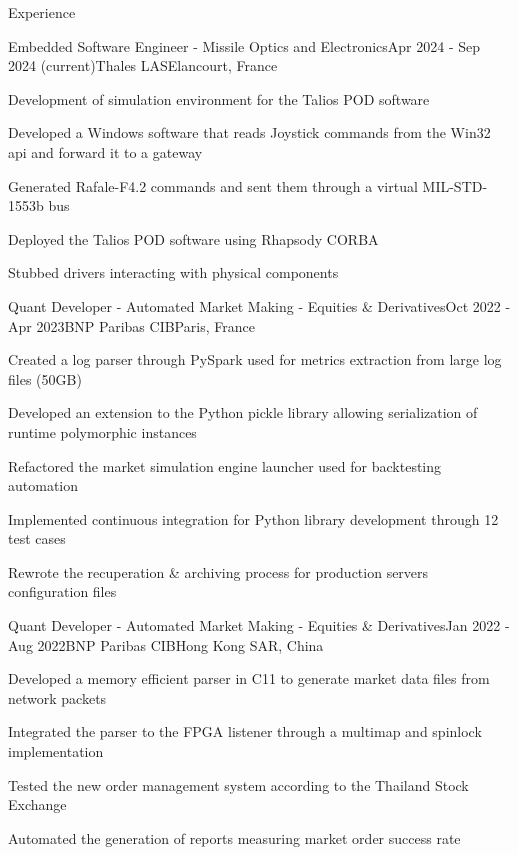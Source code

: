 \documentclass[
	a4paper, %
	10pt, %
]{resume} %
\def\CC{{C\nolinebreak[4]\hspace{-.05em}\raisebox{.4ex}{\tiny\bf ++}}}
\begin{document}
\begin{rSection}{Experience}

	\begin{rSubsection}{Embedded Software Engineer - Missile Optics and Electronics}{Apr 2024 - Sep 2024 (current)}{Thales LAS}{Elancourt, France}
		\item Development of simulation environment for the Talios POD software
    \item Developed a Windows software that reads Joystick commands from the Win32 api and forward it to a gateway
    \item Generated Rafale-F4.2 commands and sent them through a virtual MIL-STD-1553b bus
    \item Deployed the Talios POD software using Rhapsody CORBA
    \item Stubbed drivers interacting with physical components
	\end{rSubsection}

	\begin{rSubsection}{Quant Developer - Automated Market Making - Equities \& Derivatives}{Oct 2022 - Apr 2023}{BNP Paribas CIB}{Paris, France}
		\item Created a log parser through PySpark used for metrics extraction from large log files (50GB)
		\item Developed an extension to the Python pickle library allowing serialization of runtime polymorphic instances
		\item Refactored the market simulation engine launcher used for backtesting automation
		\item Implemented continuous integration for Python library development through 12 test cases
		\item Rewrote the recuperation \& archiving process for production servers configuration files
	\end{rSubsection}

	\begin{rSubsection}{Quant Developer - Automated Market Making - Equities \& Derivatives}{Jan 2022 - Aug 2022}{BNP Paribas CIB}{Hong Kong SAR, China}
		\item Developed a memory efficient parser in \CC11 to generate market data files from network packets
		\item Integrated the parser to the FPGA listener through a multimap and spinlock implementation
		\item Tested the new order management system according to the Thailand Stock Exchange
		\item Automated the generation of reports measuring market order success rate
	\end{rSubsection}

\end{rSection}
\end{document}
